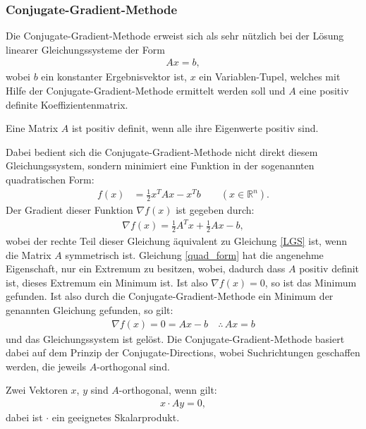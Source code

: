 \subsubsection{Conjugate-Gradient-Methode}

Die Conjugate-Gradient-Methode erweist sich als sehr nützlich bei der Lösung linearer Gleichungssysteme der Form
\begin{align}
    Ax=b \label{LGS},
\end{align}
wobei $b$ ein konstanter Ergebnisvektor ist, $x$ ein Variablen-Tupel, welches mit Hilfe der Conjugate-Gradient-Methode ermittelt werden soll und $A$ eine positiv definite Koeffizientenmatrix.
\begin{Definition}
    Eine Matrix $A$ ist positiv definit, wenn alle ihre Eigenwerte positiv sind.
\end{Definition}
Dabei bedient sich die Conjugate-Gradient-Methode nicht direkt diesem Gleichungssystem, sondern minimiert eine Funktion in der sogenannten quadratischen Form:
\begin{align}
    f(x)&=\frac{1}{2}x^T A x - x^T b \qquad (x \in \mathbb{R}^n). \label{quad_form}
\end{align}
Der Gradient dieser Funktion $\nabla f(x)$ ist gegeben durch:
\begin{align*}
    \nabla f(x) = \frac{1}{2} A^T x + \frac{1}{2}Ax - b,
\end{align*}
wobei der rechte Teil dieser Gleichung äquivalent zu Gleichung \eqref{LGS} ist, wenn die Matrix $A$ symmetrisch ist. Gleichung \eqref{quad_form} hat die angenehme Eigenschaft, nur ein Extremum zu besitzen, wobei, dadurch dass $A$ positiv definit ist, dieses Extremum ein Minimum ist. Ist also $\nabla f(x)=0$, so ist das Minimum gefunden. Ist also durch die Conjugate-Gradient-Methode ein Minimum der genannten Gleichung gefunden, so gilt:
\begin{align*}
    \nabla f(x)=0=Ax-b \quad \therefore \, Ax=b %
\end{align*}
und das Gleichungssystem ist gelöst.
Die Conjugate-Gradient-Methode basiert dabei auf dem Prinzip der Conjugate-Directions, wobei Suchrichtungen geschaffen werden, die jeweils $A$-orthogonal sind.
\begin{Definition}
    Zwei Vektoren $x$, $y$ sind $A$-orthogonal, wenn gilt:
    \begin{align*}
        x\cdot Ay = 0,
    \end{align*}
    dabei ist $\cdot$ ein geeignetes Skalarprodukt.
\end{Definition}
